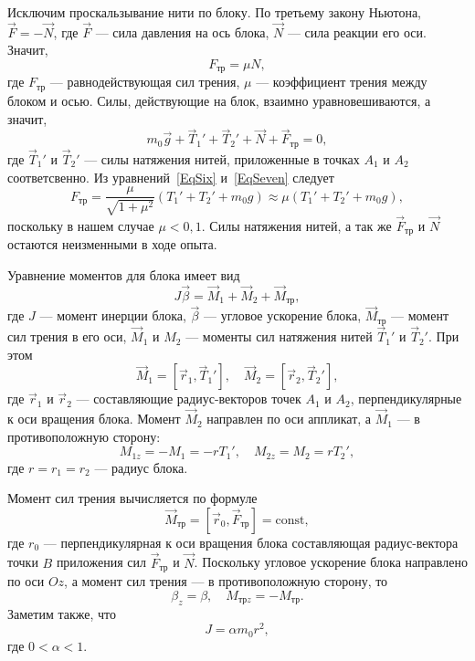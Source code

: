 Исключим проскальзывание нити по блоку. По третьему закону Ньютона, $\vec F=-\vec N$, где $\vec F$ --- сила давления на ось блока, $\vec N$ --- сила реакции его оси. Значит,
\begin{equation}\label{EqSix}
F_\text{тр}=\mu N,
\end{equation}
где $F_\text{тр}$ --- равнодействующая сил трения, $\mu$ --- коэффициент трения между блоком и осью. Силы, действующие на блок, взаимно уравновешиваются, а значит,
\begin{equation}\label{EqSeven}
m_0\vec g+\vec T_1'+\vec T_2'+\vec N+\vec F_\text{тр}=0,
\end{equation}
где $\vec T_1'$ и $\vec T_2'$ --- силы натяжения нитей, приложенные в точках $A_1$ и $A_2$ соответсвенно. Из уравнений~\eqref{EqSix} и~\eqref{EqSeven} следует
\begin{equation}\label{EqEight}
F_\text{тр}=\frac{\mu}{\sqrt{1+\mu^2}}\left(T_1'+T_2'+m_0g\right)\approx\mu\left(T_1'+T_2'+m_0g\right),
\end{equation}
поскольку в нашем случае $\mu<0{,}1$. Силы натяжения нитей, а так же $\vec F_\text{тр}$ и $\vec N$ остаются неизменными в ходе опыта.

Уравнение моментов для блока имеет вид
\begin{equation}
J\vec\beta=\vec M_1+\vec M_2+\vec M_\text{тр},
\end{equation}
где $J$ --- момент инерции блока, $\vec\beta$ --- угловое ускорение блока, $\vec M_\text{тр}$ --- момент сил трения в его оси, $\vec M_1$ и $M_2$ --- моменты сил натяжения нитей $\vec T_1'$ и $\vec T_2'$. При этом
\begin{equation}
\vec M_1=\left[\vec r_1,\vec T_1'\right],\quad\vec M_2=\left[\vec r_2,\vec T_2'\right],
\end{equation}
где $\vec r_1$ и $\vec r_2$ --- составляющие радиус-векторов точек $A_1$ и $A_2$, перпендикулярные к оси вращения блока. Момент $\vec M_2$ направлен по оси аппликат, а $\vec M_1$ --- в противоположную сторону:
\begin{equation}
M_{1z}=-M_1=-rT_1',\quad M_{2z}=M_2=rT_2',
\end{equation}
где $r=r_1=r_2$ --- радиус блока.

Момент сил трения вычисляется по формуле
\begin{equation}
\vec M_\text{тр}=\left[\vec r_0,\vec F_\text{тр}\right]=\text{const},
\end{equation}
где $r_0$ --- перпендикулярная к оси вращения блока составляющая радиус-вектора точки $B$ приложения сил $\vec F_\text{тр}$ и $\vec N$. Поскольку угловое ускорение блока направлено по оси $Oz$, а момент сил трения --- в противоположную сторону, то
\begin{equation}
\beta_z=\beta,\quad M_{\text{тр}z}=-M_\text{тр}.
\end{equation}
Заметим также, что
\begin{equation}
J=\alpha m_0r^2,
\end{equation}
где $0<\alpha<1$.

